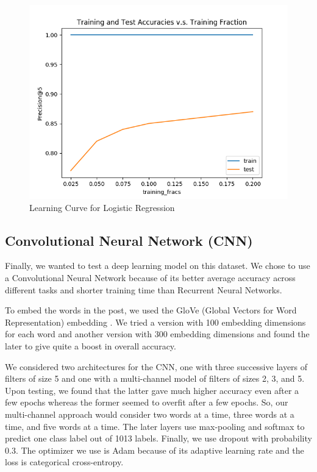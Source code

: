 \documentclass{sig-alternate-05-2015}
\begin{document}
\begin{figure}[H]
\centering
\includegraphics[width=\linewidth]{plots/learning_curve_lr.png}
\caption{Learning Curve for Logistic Regression}
\label{fig:learningCurveLR}
\end{figure}

\subsection{Convolutional Neural Network (CNN)}

Finally, we wanted to test a deep learning model on this dataset. We chose to use a Convolutional Neural Network because of its better average accuracy across different tasks and shorter training time than Recurrent Neural Networks.

To embed the words in the post, we used the GloVe (Global Vectors for Word Representation) embedding \cite{pennington2014glove}. We tried a version with 100 embedding dimensions for each word and another version with 300 embedding dimensions and found the later to give quite a boost in overall accuracy.

We considered two architectures for the CNN, one with three successive layers of filters of size 5 and one with a multi-channel model of filters of sizes 2, 3, and 5. Upon testing, we found that the latter gave much higher accuracy even after a few epochs whereas the former seemed to overfit after a few epochs. So, our multi-channel approach would consider two words at a time, three words at a time, and five words at a time. The later layers use max-pooling and softmax to predict one class label out of 1013 labels. Finally, we use dropout with probability 0.3. The optimizer we use is Adam because of its adaptive learning rate and the loss is categorical cross-entropy.
\end{document}
